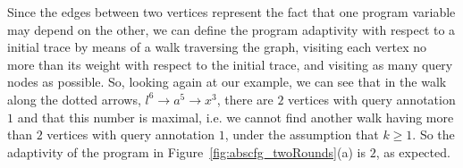 \begin{example}[twoRounds]
      
      Since the edges between two vertices represent the fact that one program variable may depend on the other,
      we can define the program adaptivity with respect to a initial trace by means of a walk traversing the graph, visiting each vertex no more than its weight with respect to the initial trace, and visiting as many query nodes as possible.
      So, looking again at our example, we can see that
      in the walk along the dotted arrows,  $l^{6} \to a^5 \to x^3 $, there are $2$ vertices with query annotation $1$ and that this number is maximal, i.e. we cannot find another walk having more than $2$ vertices with query annotation $1$, under the assumption that $k \geq 1$. So the adaptivity of the program in Figure~\ref{fig:abscfg_twoRounds}(a)  is $2$,
      as expected.
{\small
\begin{figure} 
    \centering
    \begin{subfigure}{.2\textwidth}
\end{subfigure}
\end{figure}}
\end{example}
